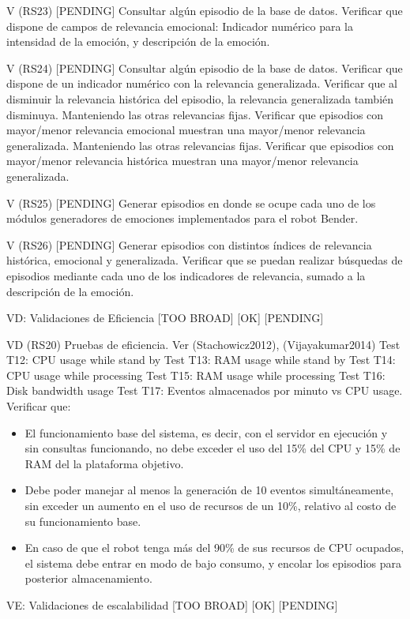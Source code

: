 V (RS23) [PENDING]
Consultar algún episodio de la base de datos. Verificar que dispone de campos de relevancia emocional: Indicador numérico para la intensidad de la emoción, y descripción de la emoción.

V (RS24) [PENDING]
Consultar algún episodio de la base de datos. Verificar que dispone de un indicador numérico con la relevancia generalizada. 
Verificar que al disminuir la relevancia histórica del episodio, la relevancia generalizada también disminuya.
Manteniendo las otras relevancias fijas. Verificar que episodios con mayor/menor relevancia emocional muestran una mayor/menor relevancia generalizada.
Manteniendo las otras relevancias fijas. Verificar que episodios con mayor/menor relevancia histórica muestran una mayor/menor relevancia generalizada.

V (RS25) [PENDING]
Generar episodios en donde se ocupe cada uno de los módulos generadores de emociones implementados para el robot Bender.

V (RS26) [PENDING]
Generar episodios con distintos índices de relevancia histórica, emocional y generalizada. Verificar que se puedan realizar búsquedas de episodios mediante cada uno de los indicadores de relevancia, sumado a la descripción de la emoción.

VD: Validaciones de Eficiencia
[TOO BROAD]
[OK]
[PENDING]

VD (RS20)
Pruebas de eficiencia. Ver (Stachowicz2012), (Vijayakumar2014)
Test T12: CPU usage while stand by
Test T13: RAM usage while stand by
Test T14: CPU usage while processing
Test T15: RAM usage while processing
Test T16: Disk bandwidth usage
Test T17: Eventos almacenados por minuto vs CPU usage.
Verificar que:
\begin{itemize}
\item El funcionamiento base del sistema, es decir, con el servidor en ejecución y sin consultas funcionando, no debe exceder el uso del 15\% del CPU y 15\% de RAM del la plataforma objetivo.
\item Debe poder manejar al menos la generación de 10 eventos simultáneamente, sin exceder un aumento en el uso de recursos de un 10\%, relativo al costo de su funcionamiento base.
\item En caso de que el robot tenga más del 90\% de sus recursos de CPU ocupados, el sistema debe entrar en modo de bajo consumo, y encolar los episodios para posterior almacenamiento.
\end{itemize}

VE: Validaciones de escalabilidad
[TOO BROAD]
[OK]
[PENDING]

